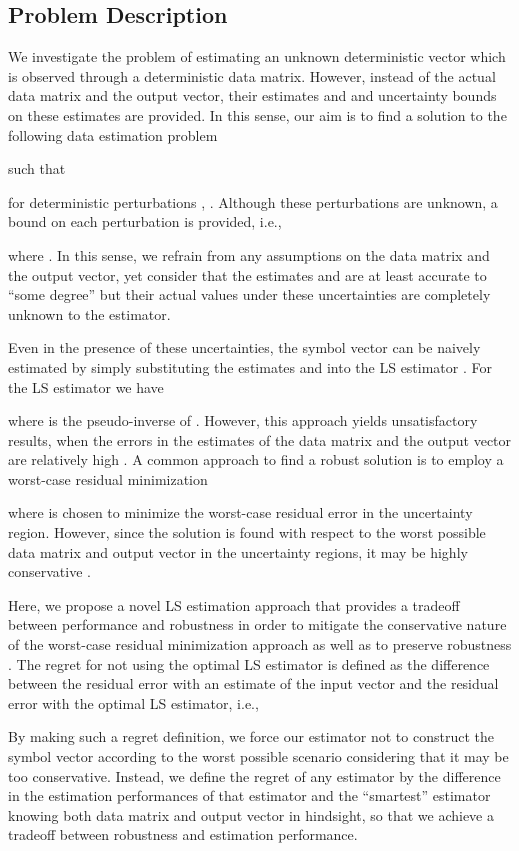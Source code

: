 \documentclass[review,sort&compress]{elsarticle}
\begin{document}
\subsection{Problem Description}
We investigate the problem of estimating an unknown deterministic vector  which is observed through a deterministic data matrix. However, instead of the actual data matrix and the output vector, their estimates  and  and uncertainty bounds on these estimates are provided. In this sense, our aim is to find a solution to the following data estimation problem

such that

for deterministic perturbations , . Although these perturbations are unknown, a bound on each perturbation is provided, i.e.,

where . In this sense, we refrain from any assumptions on the data matrix and the output vector, yet consider that the estimates  and  are at least accurate to ``some degree'' but their actual values under these uncertainties are completely unknown to the estimator.

Even in the presence of these uncertainties, the symbol vector  can be naively estimated by simply substituting the estimates  and  into the LS estimator \cite{sayedbook}. For the LS estimator we have

where  is the pseudo-inverse of  \cite{graham}. However, this approach yields unsatisfactory results, when the errors in the estimates of the data matrix and the output vector are relatively high \cite{est1, est2, yonina1, yonina2, yonina3}. A common approach to find a robust solution is to employ a worst-case residual minimization \cite{est1}

where  is chosen to minimize the worst-case residual error in the uncertainty region. However, since the solution is found with respect to the worst possible data matrix and output vector in the uncertainty regions, it may be highly conservative \cite{tls, yonina1, yonina3}.

Here, we propose a novel LS estimation approach that provides a tradeoff between performance and robustness in order to mitigate the conservative nature of the worst-case residual minimization approach as well as to preserve robustness \cite{yonina1, yonina3}. The regret for not using the optimal LS estimator is defined as the difference between the residual error with an estimate of the input vector and the residual error with the optimal LS estimator, i.e.,

By making such a regret definition, we force our estimator not to construct the symbol vector according to the worst possible scenario considering that it may be too conservative. Instead, we define the regret of any estimator by the difference in the estimation performances of that estimator and the ``smartest'' estimator knowing both data matrix and output vector in hindsight, so that we achieve a tradeoff between robustness and estimation performance.
\end{document}
